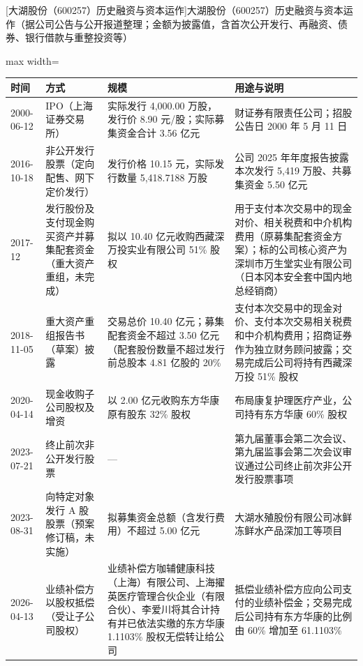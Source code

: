 \begin{center}\small\setlength{\tabcolsep}{4pt}
[大湖股份（600257）历史融资与资本运作]{大湖股份（600257）历史融资与资本运作（据公司公告与公开报道整理；金额为披露值，含首次公开发行、再融资、债券、银行借款与重整投资等）}
\begin{adjustbox}{max width=\textwidth}
\begin{tabular}{@{}p{1.45cm}p{2.55cm}p{4.05cm}p{4.95cm}@{}}
\toprule
时间 & 方式 & 规模 & 用途与说明 \\
\midrule
2000-06-12 & IPO（上海证券交易所） & 实际发行 4,\allowbreak{}000.00 万股，\allowbreak{}发行价 8.90 元/\allowbreak{}股；实际募集资金合计 3.56 亿元 & 财证券有限责任公司；招股公告日 2000 年 5 月 11 日 \\
2016-10-18 & 非公开发行股票（定向配售、网下定价发行） & 发行价格 10.15 元，\allowbreak{}实际发行数量 5,\allowbreak{}418.7188 万股 & 公司 2025 年年度报告披露本次发行 5,\allowbreak{}419 万股、\allowbreak{}共募集资金 5.50 亿元 \\
2017-12 & 发行股份及支付现金购买资产并募集配套资金（重大资产重组，未完成） & 拟以 10.40 亿元收购西藏深万投实业有限公司 51\% 股权 & 用于支付本次交易中的现金对价、\allowbreak{}相关税费和中介机构费用（原募集配套资金方案）；标的公司核心资产为深圳市万生堂实业有限公司（日本冈本安全套中国内地总经销商） \\
2018-11-05 & 重大资产重组报告书（草案）披露 & 交易总价 10.40 亿元；募集配套资金不超过 3.50 亿元（配套股份数量不超过发行前总股本 4.81 亿股的 20\% & 支付本次交易中的现金对价、\allowbreak{}支付本次交易相关税费和中介机构费用；招商证券作为独立财务顾问披露；交易完成后公司将持有西藏深万投 51\% 股权 \\
2020-04-14 & 现金收购子公司股权及增资 & 以 2.00 亿元收购东方华康原有股东 32\% 股权 & 布局康复护理医疗产业，\allowbreak{}公司持有东方华康 60\% 股权 \\
2023-07-21 & 终止前次非公开发行股票 & --- & 第九届董事会第二次会议、\allowbreak{}第九届监事会第二次会议审议通过公司终止前次非公开发行股票事项 \\
2023-08-31 & 向特定对象发行 A 股股票（预案修订稿，未实施） & 拟募集资金总额（含发行费用）不超过 5.00 亿元 & 大湖水殖股份有限公司冰鲜冻鲜水产品深加工等项目 \\
2026-04-13 & 业绩补偿方以股权抵偿（受让子公司股权） & 业绩补偿方咖辅健康科技（上海）有限公司、\allowbreak{}上海擢英医疗管理合伙企业（有限合伙）、\allowbreak{}李爱川将其合计持有并已依法实缴的东方华康 1.1103\% 股权无偿转让给公司 & 抵偿业绩补偿方应向公司支付的业绩补偿金；交易完成后公司持有东方华康的比例由 60\% 增加至 61.1103\% \\
\bottomrule
\end{tabular}
\end{adjustbox}
\end{center}

